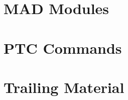 \documentclass[11pt,a4paper,twoside]{report}
\begin{document}
\part{MAD Modules}                      


\part{PTC Commands}


\part{Trailing Material}





\printindex

%
%
%
%
%
%
%
%

\end{document}
